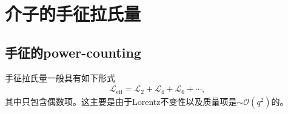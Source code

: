 \documentclass[aps,tightenlines,16pt]{ctexart}
\numberwithin{equation}{section}
\newcommand{\mO}{\mathcal{O}}
\newcommand{\mL}{\mathcal{L}}
\newcommand{\bm}[1]{\mbox{\boldmath{$#1$}}}
\begin{document}




\section{介子的手征拉氏量}
\subsection{手征的power-counting}
手征拉氏量一般具有如下形式
\begin{align}
   \mL_{\text{eff}} = \mL_2 + \mL_4 + \mL_6+\cdots,
\end{align}
其中只包含偶数项。这主要是由于Lorentz不变性以及质量项是$\sim\mO(q^2)$的。
\end{document}
